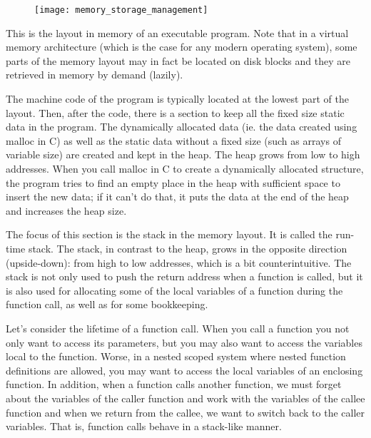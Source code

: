 \documentclass[a4paper, twoside]{article}
\begin{document}
\begin{figure}[H]
	\centering
	\texttt{[image: memory\_storage\_management]}
	\label{fig:memory_storage_management}
\end{figure}

This is the layout in memory of an executable program. Note that in a virtual memory architecture (which is the case for any modern operating system), some parts of the memory layout may in fact be located on disk blocks and they are retrieved in memory by demand (lazily).

The machine code of the program is typically located at the lowest part of the layout. Then, after the code, there is a section to keep all the fixed size static data in the program. The dynamically allocated data (ie. the data created using malloc in C) as well as the static data without a fixed size (such as arrays of variable size) are created and kept in the heap. The heap grows from low to high addresses. When you call malloc in C to create a dynamically allocated structure, the program tries to find an empty place in the heap with sufficient space to insert the new data; if it can't do that, it puts the data at the end of the heap and increases the heap size.

The focus of this section is the stack in the memory layout. It is called the run-time stack. The stack, in contrast to the heap, grows in the opposite direction (upside-down): from high to low addresses, which is a bit counterintuitive. The stack is not only used to push the return address when a function is called, but it is also used for allocating some of the local variables of a function during the function call, as well as for some bookkeeping.

Let’s consider the lifetime of a function call. When you call a function you not only want to access its parameters, but you may also want to access the variables local to the function. Worse, in a nested scoped system where nested function definitions are allowed, you may want to access the local variables of an enclosing function. In addition, when a function calls another function, we must forget about the variables of the caller function and work with the variables of the callee function and when we return from the callee, we want to switch back to the caller variables. That is, function calls behave in a stack-like manner.
\end{document}

